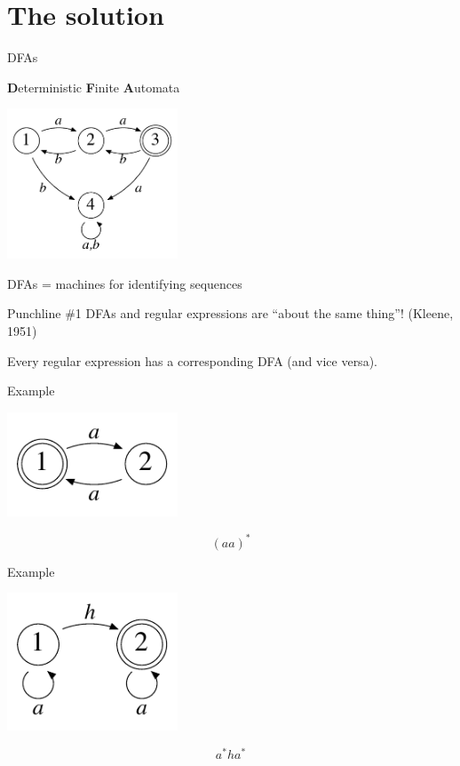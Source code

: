 \documentclass[xcolor=svgnames,12pt]{beamer}
\newenvironment{xframe}[1][]
  {\begin{frame}[fragile,environment=xframe,#1]}
  {\end{frame}}
\begin{document}
\section{The solution}

\begin{xframe}{DFAs}
  \begin{center}
    \textbf{D}eterministic \textbf{F}inite \textbf{A}utomata \bigskip

    \includegraphics[width=2in]{example-DFA}

    DFAs = machines for identifying sequences
  \end{center}
\end{xframe}

\begin{xframe}{Punchline \#1}
  DFAs and regular expressions are ``about the same thing''! (Kleene,
  1951) \bigskip

  Every regular expression has a corresponding DFA (and vice versa).
\end{xframe}

\begin{xframe}{Example}
  \begin{center}
    \includegraphics[width=2in]{even-DFA}

    \[ (aa)^* \]
  \end{center}
\end{xframe}

\begin{xframe}{Example}
  \begin{center}
    \includegraphics[width=2in]{deriv-DFA}

    \[ a^*ha^* \]
  \end{center}
\end{xframe}
\end{document}

